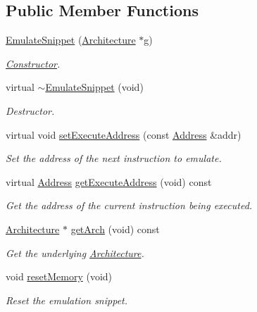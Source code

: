 \subsection*{Public Member Functions}
\begin{DoxyCompactItemize}
\item 
\mbox{\hyperlink{class_emulate_snippet_ad9f38ff5be18035f04b0ced7451ab0d4}{Emulate\+Snippet}} (\mbox{\hyperlink{class_architecture}{Architecture}} $\ast$g)
\begin{DoxyCompactList}\small\item\em \mbox{\hyperlink{class_constructor}{Constructor}}. \end{DoxyCompactList}\item 
virtual \mbox{\hyperlink{class_emulate_snippet_af333890e0d9a94efbd3557070a829a44}{$\sim$\+Emulate\+Snippet}} (void)
\begin{DoxyCompactList}\small\item\em Destructor. \end{DoxyCompactList}\item 
virtual void \mbox{\hyperlink{class_emulate_snippet_a22a13101a25f73f33a9b10f20ebf018a}{set\+Execute\+Address}} (const \mbox{\hyperlink{class_address}{Address}} \&addr)
\begin{DoxyCompactList}\small\item\em Set the address of the next instruction to emulate. \end{DoxyCompactList}\item 
virtual \mbox{\hyperlink{class_address}{Address}} \mbox{\hyperlink{class_emulate_snippet_aef11e510794c009453333e847acc38e9}{get\+Execute\+Address}} (void) const
\begin{DoxyCompactList}\small\item\em Get the address of the current instruction being executed. \end{DoxyCompactList}\item 
\mbox{\hyperlink{class_architecture}{Architecture}} $\ast$ \mbox{\hyperlink{class_emulate_snippet_a17efc692edeba1967afa4ff66f42fc5f}{get\+Arch}} (void) const
\begin{DoxyCompactList}\small\item\em Get the underlying \mbox{\hyperlink{class_architecture}{Architecture}}. \end{DoxyCompactList}\item 
void \mbox{\hyperlink{class_emulate_snippet_a243812d9450f7d70610e23924def533f}{reset\+Memory}} (void)
\begin{DoxyCompactList}\small\item\em Reset the emulation snippet. \end{DoxyCompactList}\item 

\end{DoxyCompactItemize}

